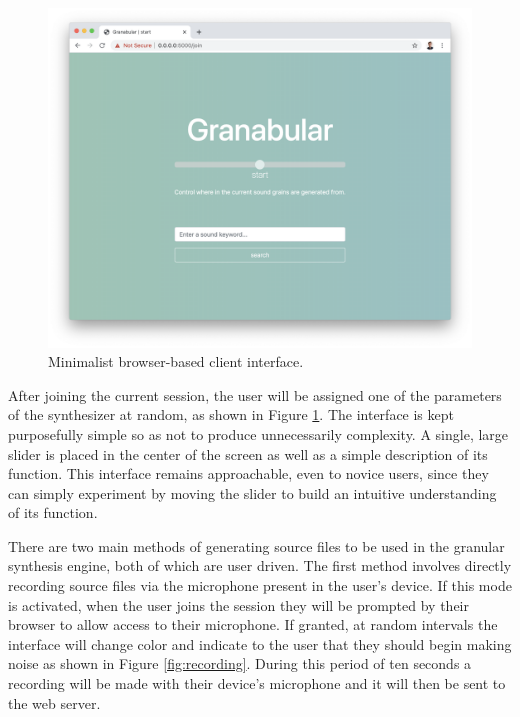 \documentclass{nime-alternate}
\begin{document}
\begin{figure}[hbt!] \label{fig:controller}
	\includegraphics[width=\linewidth]{../img/controller.png}
	\caption{Minimalist browser-based client interface.}
	\centering
\end{figure}

After joining the current session, the user will be assigned one of the parameters of the synthesizer
at random, as shown in Figure \ref{fig:controller}. The interface is kept purposefully simple so as not 
to produce unnecessarily complexity. A single, large slider is placed in the center of the screen
as well as a simple description of its function. This interface remains approachable, even to novice users,
since they can simply experiment by moving the slider to build an intuitive understanding of its function. 

There are two main methods of generating source files to be used in the granular synthesis engine, both of which are user driven.
The first method involves directly recording source files via the microphone present in the user's device. 
If this mode is activated, when the user joins the session they will be prompted by their browser to allow access to their microphone.
If granted, at random intervals the interface will change color and indicate to the user that they should begin making noise as shown in Figure \ref{fig:recording}.
During this period of ten seconds a recording will be made with their device's microphone and it will then be sent to the web server. 
\end{document}
